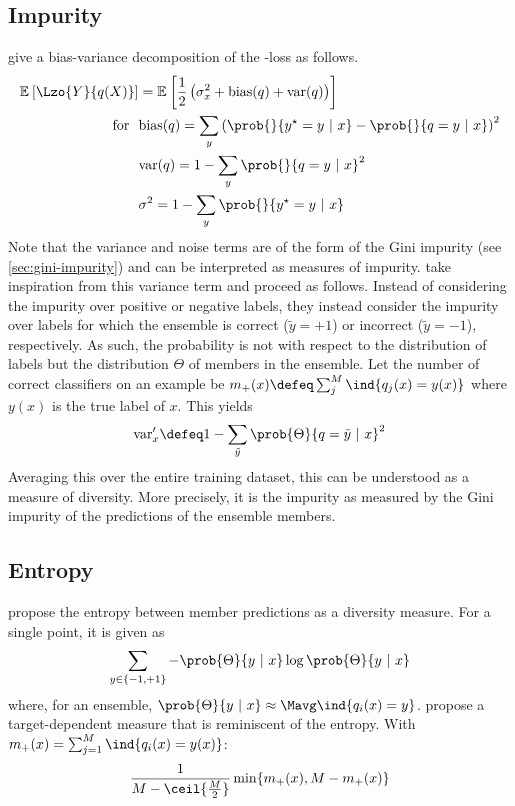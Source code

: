 \documentclass[../main.tex]{subfiles}
\begin{document}
\subsection{Impurity} 
\citeauthor{KohaviWolpert} give a bias-variance decomposition of the \zeroone-loss as follows.
$$
\begin{align}
\mathbb{E}_{}\left[ \Lzo{Y}{q(X)} \right] &= 
\mathbb{E}_{}\left[  
\frac{1}{2}\left( \sigma^2_{x} + \text{bias}(q) + \text{var}(q)   \right)
\right] \\
\text{for} ~ ~ & \text{bias}(q) =  \sum_{y} \left(  \prob{}{y^\star = y ~|~x} - \prob{}{q=y ~|~ x} \right)^2 \\
& \text{var}(q) = 1 - \sum_{y} \prob{}{q=y ~|~x}^2  \\
& \sigma^2 = 1 - \sum_{y} \prob{}{y^\star = y ~|~ x}
\end{align}
$$
Note that the variance and noise terms are of the form of the Gini impurity (see \ref{sec:gini-impurity}) and can be interpreted as measures of impurity.
\citeauthor{kuncheva_MeasuresDiversityClassifier_2003} take inspiration from this variance term and proceed as follows. Instead of considering the impurity over positive or negative labels, they instead consider the impurity over labels for which the ensemble is correct ($\tilde{y} = +1$) or incorrect ($\tilde{y} = -1$), respectively. As such, the probability is not with respect to the distribution of labels but the distribution $\Theta$ of members in the ensemble. Let the number of correct classifiers on an example be $m_{+}(x) \defeq \sum_{j}^M \ind{q_{j}(x) = y(x)}$ where $y(x)$ is the true label of $x$. This yields
$$
\text{var}'_{x} \defeq 1 - \sum_{\tilde{y}} \prob{\Theta}{q = \tilde{y} ~ |~ x}^2
$$
Averaging this over the entire training dataset, this can be understood as a measure of diversity. More precisely, it is the impurity as measured by the Gini impurity of the predictions of the ensemble members.

\subsection{Entropy}
\citeauthor{cunningham_DiversityQualityClassification_2000} propose the entropy between member predictions as a diversity measure. For a single point, it is given as
$$
\sum_{y \in \{ -1, +1 \}} - \prob{\Theta}{y ~|~x} \log \prob{\Theta}{y~|~x}
$$
where, for an ensemble, $\prob{\Theta}{y~|~x} \approx \Mavg \ind{q_{i}(x) = y}$.
\citeauthor{shipp_RelationshipsCombinationMethods_2002} propose a target-dependent measure that is reminiscent of the entropy. With $m_{+}(x) = \sum_{j=1}^M \ind{q_{i}(x) = y(x)}$:
$$
\frac{1}{M - \ceil{\frac{M}{2}}} \min \{ m_{+}(x), M-m_{+}(x) \}
$$
\end{document}
